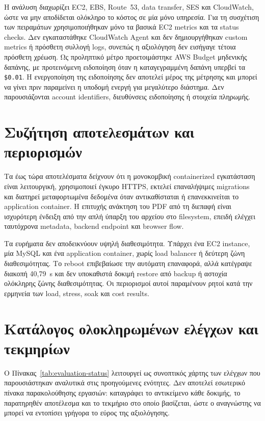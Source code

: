 Η ανάλυση διαχωρίζει EC2, EBS, Route~53, data transfer, SES και CloudWatch,
ώστε να μην αποδίδεται ολόκληρο το κόστος σε μία μόνο υπηρεσία. Για τη
συσχέτιση των πειραμάτων χρησιμοποιήθηκαν μόνο τα βασικά EC2 metrics και τα
status checks. Δεν εγκαταστάθηκε CloudWatch Agent και δεν δημιουργήθηκαν
custom metrics ή πρόσθετη συλλογή logs, συνεπώς η αξιολόγηση δεν εισήγαγε
τέτοια πρόσθετη χρέωση. Ως προληπτικό μέτρο προετοιμάστηκε AWS Budget
μηδενικής δαπάνης, με προτεινόμενη ειδοποίηση όταν η καταγεγραμμένη δαπάνη
υπερβεί τα \texttt{\$0.01}. Η ενεργοποίηση της ειδοποίησης δεν αποτελεί
μέρος της μέτρησης και μπορεί να γίνει πριν παραμείνει η υποδομή ενεργή για
μεγαλύτερο διάστημα. Δεν παρουσιάζονται account identifiers, διευθύνσεις
ειδοποίησης ή στοιχεία πληρωμής.

\section{Συζήτηση αποτελεσμάτων και περιορισμών}
Τα έως τώρα αποτελέσματα δείχνουν ότι η μονοκομβική containerized εγκατάσταση
είναι λειτουργική, χρησιμοποιεί έγκυρο HTTPS, εκτελεί επαναλήψιμες migrations
και διατηρεί μεταφορτωμένα δεδομένα όταν αντικαθίσταται ή επανεκκινείται το
application container. Η επιτυχής ανάκτηση του PDF από τη διεπαφή είναι
ισχυρότερη ένδειξη από την απλή ύπαρξη του αρχείου στο filesystem, επειδή
ελέγχει ταυτόχρονα metadata, backend endpoint και browser flow.

Τα ευρήματα δεν αποδεικνύουν υψηλή διαθεσιμότητα. Υπάρχει ένα EC2 instance,
μία MySQL και ένα application container, χωρίς load balancer ή δεύτερη ζώνη
διαθεσιμότητας. Το reboot επιβεβαίωσε την αυτόματη επαναφορά, αλλά κατέγραψε
διακοπή 40,79~s και δεν υποκαθιστά δοκιμή restore από backup ή αστοχία
ολόκληρης ζώνης διαθεσιμότητας. Οι περιορισμοί αυτοί παραμένουν ρητοί κατά
την ερμηνεία των load, stress, soak και cost results.

\section{Κατάλογος ολοκληρωμένων ελέγχων και τεκμηρίων}
Ο Πίνακας~\ref{tab:evaluation-status} λειτουργεί ως συνοπτικός χάρτης των
ελέγχων που παρουσιάστηκαν αναλυτικά στις προηγούμενες ενότητες. Δεν
αποτελεί εσωτερικό πίνακα παρακολούθησης εργασιών: καταγράφει το αντικείμενο
κάθε δοκιμής, το παρατηρηθέν αποτέλεσμα και το τεκμήριο στο οποίο βασίζεται,
ώστε ο αναγνώστης να μπορεί να εντοπίσει γρήγορα το εύρος της αξιολόγησης.

